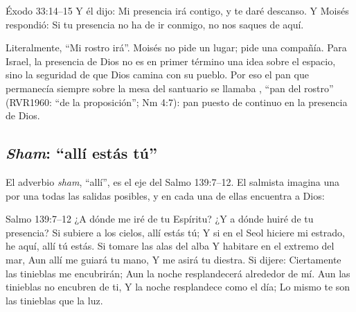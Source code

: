 \begin{verso}{Éxodo 33:14–15}
Y él dijo: Mi presencia irá contigo, y te daré descanso. Y Moisés respondió: Si tu presencia no ha de ir conmigo, no nos saques de aquí.
\end{verso}

Literalmente, ``Mi rostro irá''. Moisés no pide un lugar; pide una compañía. Para Israel, la presencia de Dios no es en primer término una idea sobre el espacio, sino la seguridad de que Dios camina con su pueblo. Por eso el pan que permanecía siempre sobre la mesa del santuario se llamaba , ``pan del rostro'' (RVR1960: ``de la proposición''; Nm 4:7): pan puesto de continuo en la presencia de Dios.

\subsection{\emph{Sham}: “allí estás tú”}

El adverbio  \emph{sham}, ``allí'', es el eje del Salmo 139:7--12. El salmista imagina una por una todas las salidas posibles, y en cada una de ellas encuentra a Dios:

\begin{verso}{Salmo 139:7–12}
¿A dónde me iré de tu Espíritu? ¿Y a dónde huiré de tu presencia? Si subiere a los cielos, allí estás tú; Y si en el Seol hiciere mi estrado, he aquí, allí tú estás. Si tomare las alas del alba Y habitare en el extremo del mar, Aun allí me guiará tu mano, Y me asirá tu diestra. Si dijere: Ciertamente las tinieblas me encubrirán; Aun la noche resplandecerá alrededor de mí. Aun las tinieblas no encubren de ti, Y la noche resplandece como el día; Lo mismo te son las tinieblas que la luz.
\end{verso}


